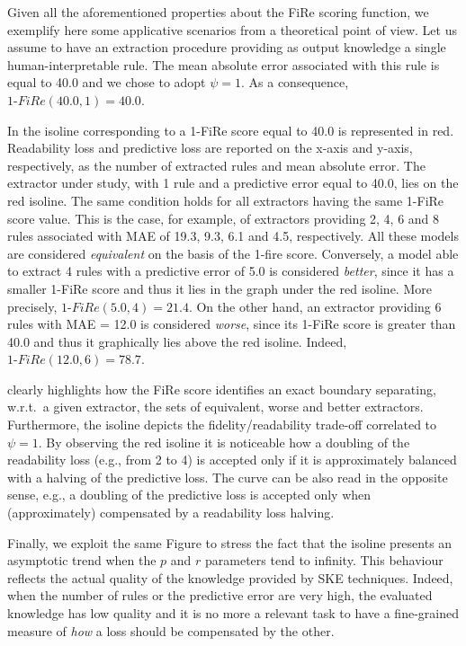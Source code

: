 \documentclass{article}
\newcommand{\fire}{FiRe}
\begin{document}
Given all the aforementioned properties about the \fire{} scoring function, we exemplify here some applicative scenarios from a theoretical point of view.
%
Let us assume to have an extraction procedure providing as output knowledge a single human-interpretable rule.
%
The mean absolute error associated with this rule is equal to 40.0 and we chose to adopt $\psi=1$.
%
As a consequence, $1\textrm{-}\fire(40.0, 1)=40.0$.

In  the isoline corresponding to a 1-\fire{} score equal to 40.0 is represented in red.
%
Readability loss and predictive loss are reported on the x-axis and y-axis, respectively, as the number of extracted rules and mean absolute error.
%
The extractor under study, with 1 rule and a predictive error equal to 40.0, lies on the red isoline.
%
The same condition holds for all extractors having the same 1-\fire{} score value.
%
This is the case, for example, of extractors providing 2, 4, 6 and 8 rules associated with MAE of 19.3, 9.3, 6.1 and 4.5, respectively.
%
All these models are considered \emph{equivalent} on the basis of the 1-fire{} score.
%
Conversely, a model able to extract 4 rules with a predictive error of 5.0 is considered \emph{better}, since it has a smaller 1-\fire{} score and thus it lies in the graph under the red isoline.
%
More precisely, $1\textrm{-}\fire(5.0, 4)=21.4$.
%
On the other hand, an extractor providing 6 rules with MAE = 12.0 is considered \emph{worse}, since its 1-\fire{} score is greater than 40.0 and thus it graphically lies above the red isoline.
%
Indeed, $1\textrm{-}\fire(12.0, 6)=78.7$.

 clearly highlights how the \fire{} score identifies an exact boundary separating, w.r.t.\ a given extractor, the sets of equivalent, worse and better extractors.
%
Furthermore, the isoline depicts the fidelity/readability trade-off correlated to $\psi=1$.
%
%
By observing the red isoline it is noticeable how a doubling of the readability loss (e.g., from 2 to 4) is accepted only if it is approximately balanced with a halving of the predictive loss.
%
The curve can be also read in the opposite sense, e.g., a doubling of the predictive loss is accepted only when (approximately) compensated by a readability loss halving.

Finally, we exploit the same Figure to stress the fact that the isoline presents an asymptotic trend when the $p$ and $r$ parameters tend to infinity.
%
This behaviour reflects the actual quality of the knowledge provided by SKE techniques.
%
Indeed, when the number of rules or the predictive error are very high, the evaluated knowledge has low quality and it is no more a relevant task to have a fine-grained measure of \emph{how} a loss should be compensated by the other.
\end{document}
